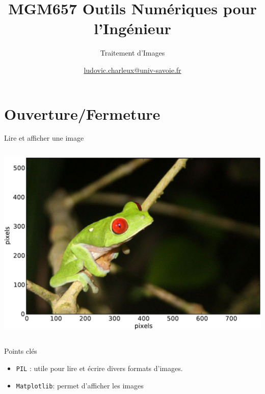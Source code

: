 \documentclass[8pt,a4paper]{beamer}
\author[LC]{\href{mailto:ludovic.charleux@univ-savoie.fr}{ludovic.charleux@univ-savoie.fr}}
\title{MGM657 Outils Numériques pour l'Ingénieur}
\subtitle{Traitement d'Images}
\date{}
\institute{\url{www.polytech.univ-savoie.fr}}
\begin{document}
\begin{frame}[plain]
\titlepage
\tableofcontents
\end{frame}

\section{Ouverture/Fermeture}
  
\begin{frame}[containsverbatim]{Lire et afficher une image}
  \begin{columns}
  \includegraphics[width=\textwidth]{figures/grenouille.pdf} 
  
  \end{columns}
  \begin{block}{Points clés}
  \begin{itemize}
  \item \verb!PIL! : utile pour lire et écrire divers formats d'images.
  \item \verb!Matplotlib!: permet d'afficher les images
  \end{itemize}
  \end{block}
\end{frame}
\end{document}
